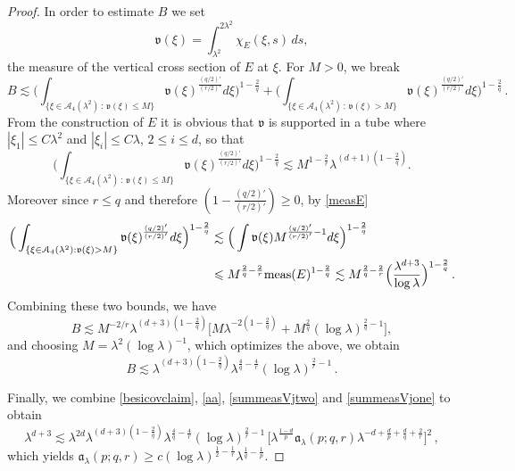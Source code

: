 \documentclass[11pt]{amsart}
\theoremstyle{definition}
\numberwithin{theorem}{section}
\numberwithin{definition}{section}
\numberwithin{equation}{section}
\newcommand{\Be}{\begin{equation}}
\newcommand{\Ee}{\end{equation}}
\renewcommand{\le}{\leqslant}
\renewcommand{\ge}{\geqslant}
\def\meas{{\text{\rm meas}}}
\def\lc{\lesssim}
\def\la{\lambda}             \def\La{\Lambda}
\def\fa{{\mathfrak {a}}}
\def\fv{{\mathfrak {v}}}
\def\cA{{\mathcal {A}}}
\renewcommand{\le}{\leqslant}
\renewcommand{\ge}{\geqslant}
\begin{document}
\begin{proof}
In order to  estimate $B$  we set
$$\fv(\xi)=\int_{\la^2}^{2\la^2} \chi_E(\xi, s ) \, d s ,$$
 the measure of the vertical
cross section of $E$ at $\xi$.
For $M>0$, we break
$$
B\lesssim
\Big(\int_{\{\xi\in \cA_4(\la^2)\,:\, \fv(\xi)\le M\}}
\fv(\xi)^{\frac{(q/2)'}{(r/2)'} }
d\xi\Big)^{1-\frac 2q} +
\Big(\int_{\{\xi\in \cA_4(\la^2)\,:\, \fv(\xi)> M\}}
\fv(\xi)^{\frac{(q/2)'}{(r/2)'} }
d\xi\Big)^{1-\frac 2q}\,.
$$
From the construction  of $E$ it is obvious that  $\fv$ is supported  in a tube where
$|\xi_1|\le C\la^2$ and $|\xi_i|\le C\la$, $2\le i\le d$, so
that
$$\Big(\int_{\{\xi\in \cA_4(\la^2)\,:\, \fv(\xi)\le M\}}
\fv(\xi)^{\frac{(q/2)'}{(r/2)'} }
d\xi\Big)^{1-\frac 2q} \lc
M^{1-\frac 2r} \la^{(d+1)(1-\frac 2q)}.
$$
Moreover since  $r\le q$ and therefore $(1-\tfrac{(q/2)'}{(r/2)'})\ge 0$,   by \eqref{measE}
\begin{align*}
\Big(\int_{\{\xi\in \cA_4(\la^2): \fv(\xi)>M\}}
\fv(\xi)^{\frac{(q/2)'}{(r/2)'} }
d\xi\Big)^{1-\frac 2q} &\lc
\Big(\int \fv(\xi)
M^{\frac{(q/2)'}{(r/2)'}-1 }
d\xi\Big)^{1-\frac 2q}
\\
&\le M^{\frac 2q-\frac 2r} \meas(E)^{1-\frac 2q}
\lc
M^{\frac 2q-\frac 2r} \Big(\frac{\la^{d+3}}{\log\la}\Big)^{1-\frac 2q}\, .
\end{align*}
Combining these two bounds, we have
\[
B\lc M^{-2/r} \la^{(d+3)(1-\frac 2q)} \big[M \la^{-2(1-\frac 2q)}+
M^{\frac 2q} (\log \la)^{\frac 2q-1}\big],
\] and choosing $M= \la^2 (\log\la)^{-1}$, which optimizes the above,  we obtain
\Be \label{besicovclaim}
B\lc \la^{(d+3)(1-\frac2q)}
\la^{\frac 4q-\frac 4r} (\log \la)^{\frac 2r-1}\,.
\Ee

Finally, we combine \eqref{besicovclaim}, \eqref{aa}, \eqref{summeasVjtwo} and \eqref{summeasVjone} to obtain
$$\la^{d+3}
\lc  \la^{2d} \la^{(d+3)(1-\frac2q)}
\la^{\frac 4q-\frac 4r} (\log \la)^{\frac 2r-1}\,
 \big[ \la^{\frac {1-d}{p}}
\fa_{\la}(p;q,r)
\la^{-d+\frac{d}{p}+\frac {d}{q}+\frac {2}{r}}\big]^2 \,,
$$
which yields  $\fa_\la(p;q,r)\ge c(\log \la)^{\frac 12-\frac 1r}
\la^{\frac 1q-\frac 1p}$.
\end{proof}
\end{document}
